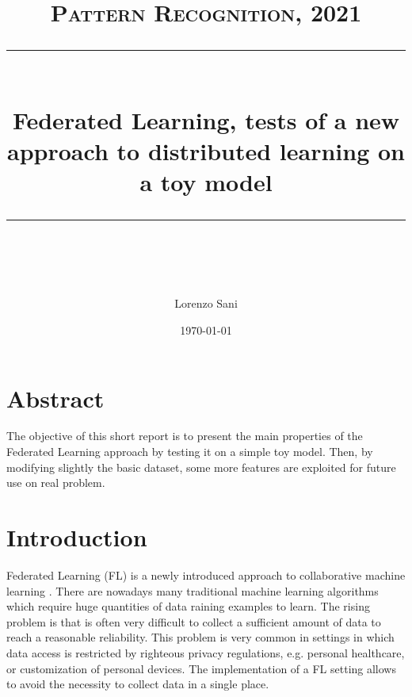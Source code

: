 \documentclass{article} %
\title{
\normalfont \normalsize 
\textsc{Pattern Recognition, 2021} \\ 
[10pt] 
\rule{\linewidth}{0.5pt} \\[6pt] 
\huge 
Federated Learning, tests of a new approach to distributed learning on a toy model
\rule{\linewidth}{2pt}  \\[10pt]
}
\author{Lorenzo Sani}
\date{\normalsize \today}
\begin{document}
\maketitle

\tableofcontents

\section{Abstract}
The objective of this short report is to present the main properties of the 
Federated Learning approach by testing it on a simple toy model. Then, by 
modifying slightly the basic dataset, some more features are exploited for 
future use on real problem.
\section{Introduction}
Federated Learning (FL) is a newly introduced approach to collaborative machine 
learning \cite{9153560}.
There are nowadays many traditional machine learning algorithms which 
require huge quantities of data raining examples to learn.
The rising problem is 
that is often very difficult to collect a sufficient amount of data to reach a 
reasonable reliability.
This problem is very common in settings in which data 
access is restricted by righteous privacy regulations, e.g. personal healthcare, 
or customization of personal devices.
The implementation of a FL setting allows 
to avoid the necessity to collect data in a single place.
\end{document}
